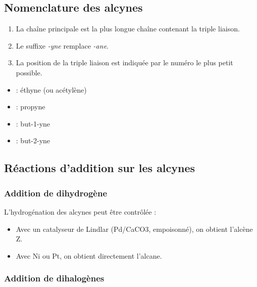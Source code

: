 \subsection{Nomenclature des alcynes}

\begin{loi}
\begin{enumerate}
    \item La chaîne principale est la plus longue chaîne contenant la triple liaison.
    \item Le suffixe \textit{-yne} remplace \textit{-ane}.
    \item La position de la triple liaison est indiquée par le numéro le plus petit possible.
\end{enumerate}
\end{loi}

\begin{exemple}
\begin{itemize}
    \item {} : éthyne (ou acétylène)
    \item {} : propyne
    \item {} : but-1-yne
    \item {} : but-2-yne
\end{itemize}
\end{exemple}

\subsection{Réactions d'addition sur les alcynes}

\subsubsection{Addition de dihydrogène}

\begin{experience}[Hydrogénation]
L'hydrogénation des alcynes peut être contrôlée :
\begin{itemize}
    \item Avec un catalyseur de Lindlar (Pd/CaCO3, empoisonné), on obtient l'alcène Z.
    \item Avec Ni ou Pt, on obtient directement l'alcane.
\end{itemize}
\end{experience}

\subsubsection{Addition de dihalogènes}

